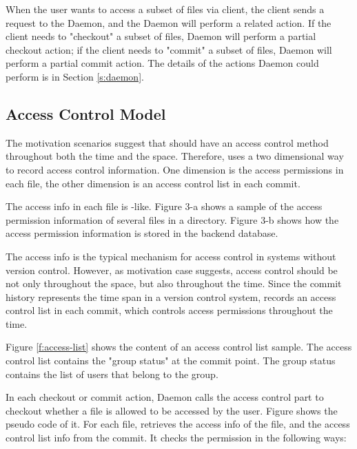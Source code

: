 When the user wants to access a subset of files via \sys client, the client
sends a request to the \Sys Daemon, and the \Sys Daemon will perform a related
action. If the client needs to "checkout" a subset of files, \Sys Daemon will
perform a partial checkout action; if the client needs to "commit" a subset of
files, \Sys Daemon will perform a partial commit action. The details of the
actions \Sys Daemon could perform is in Section \ref{s:daemon}.


\subsection{Access Control Model}

The motivation scenarios suggest that \sys should have an access control method
throughout both the time and the space. 
Therefore, \sys uses a two dimensional  way to record
access control information. One dimension is the access permissions in each
file, the other dimension is an access control list in each commit.

The access info in each file is \unix-like.
Figure 3-a  shows a sample of the access permission
information of several files in a directory. Figure 3-b
shows how the access
permission information is stored in the backend \git database.

The access info is the typical mechanism for access control in systems
without version control. However, as motivation case  suggests, access control should be not only
throughout the space, but also throughout the time. Since the
commit history represents the time span in a version control system, \sys
records an access control list in each commit, which controls access permissions
throughout the time.



Figure \ref{f:access-list} shows the content of an access control
list sample. The access control list contains the "group status" at the commit
point. The group status contains the list of users that belong to the group.

In each checkout or commit action, \Sys Daemon calls the access control part to
checkout whether a file is allowed to be accessed by the user. Figure
 shows the pseudo code of it.
For each file, \sys retrieves the access info of the file, and the access
control list info from the commit. It checks the permission in the following
ways:

